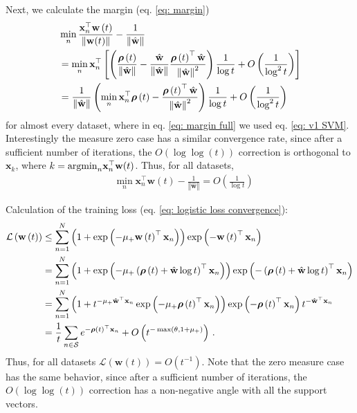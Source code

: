 \documentclass[twoside,11pt,english]{article}
\newcommand{\norm}[1]{\left\lVert{#1}\right\rVert}
\begin{document}
Next, we calculate the margin (eq. \ref{eq: margin})
\begin{align}
 & \min_{n}\frac{\mathbf{x}_{n}^{\top}\mathbf{w}\left(t\right)}{\norm{\wvec(t)}}- \frac{1}{\left\Vert \hat{\mathbf{w}}\right\Vert }\nonumber \\
 & =\min_{n}\mathbf{x}_{n}^{\top}\left[\left(\frac{\boldsymbol{\rho}\left(t\right)}{\left\Vert \hat{\mathbf{w}}\right\Vert }-\frac{\hat{\mathbf{w}}}{\left\Vert \hat{\mathbf{w}}\right\Vert }\frac{\boldsymbol{\rho}\left(t\right)^{\top}\hat{\mathbf{w}}}{\left\Vert \hat{\mathbf{w}}\right\Vert ^{2}}\right)\frac{1}{\log t}+O\left(\frac{1}{\log^{2}t}\right)\right]\nonumber \\
 & =\frac{1}{\left\Vert \hat{\mathbf{w}}\right\Vert }\left(\min_{n}\mathbf{x}_{n}^{\top}\boldsymbol{\rho}\left(t\right)-\frac{\boldsymbol{\rho}\left(t\right)^{\top}\hat{\mathbf{w}}}{\left\Vert \hat{\mathbf{w}}\right\Vert ^{2}}\right)\frac{1}{\log t}+O\left(\frac{1}{\log^{2}t}\right)\label{eq: margin full}
\end{align}
for almost every dataset, where in eq. \ref{eq: margin full} we used eq. \ref{eq: v1 SVM}. Interestingly the measure zero case has a similar convergence rate, since after a sufficient number of iterations, the $O(\log \log (t))$ correction is orthogonal to $\mathbf{x}_k$, where $k=\mathrm{argmin}_n \mathbf{x}_{n}^{\top} \mathbf{w}(t)$.
Thus, for all datasets,
\begin{align}
 & \min_{n}\mathbf{x}_{n}^{\top}\mathbf{w}\left(t\right) -\frac{1}{\left\Vert \hat{\mathbf{w}}\right\Vert } = O\left(\frac{1}{\log t}\right)
\end{align}

Calculation of the training loss (eq. \ref{eq: logistic loss convergence}):
\begin{align*}
\mathcal{L}\left(\mathbf{w}\left(t\right)\right) & \leq\sum_{n=1}^{N}\left(1+\exp\left(-\mu_{+}\mathbf{w}\left(t\right)^{\top}\mathbf{x}_{n}\right)\right)\exp\left(-\mathbf{w}\left(t\right)^{\top}\mathbf{x}_{n}\right)\\
 & =\sum_{n=1}^{N}\left(1+\exp\left(-\mu_{+}\left(\boldsymbol{\rho}\left(t\right)+\hat{\mathbf{w}}\log t\right)^{\top}\mathbf{x}_{n}\right)\right)\exp\left(-\left(\boldsymbol{\rho}\left(t\right)+\hat{\mathbf{w}}\log t\right)^{\top}\mathbf{x}_{n}\right)\\
 & =\sum_{n=1}^{N}\left(1+t^{-\mu_{+}\hat{\mathbf{w}}^{\top}\mathbf{x}_{n}}\exp\left(-\mu_{+}\boldsymbol{\rho}\left(t\right)^{\top}\mathbf{x}_{n}\right)\right)\exp\left(-\boldsymbol{\rho}\left(t\right)^{\top}\mathbf{x}_{n}\right)t^{-\hat{\mathbf{w}}^{\top}\mathbf{x}_{n}}\\
 & =\frac{1}{t}\sum_{n\in\mathcal{S}}e^{-\boldsymbol{\rho}\left(t\right)^{\top}\mathbf{x}_{n}}+O\left(t^{-\max\left(\theta,1+\mu_{+}\right)}\right)\,.
\end{align*}
Thus, for all datasets $\mathcal{L}\left(\mathbf{w}\left(t\right)\right)=O(t^{-1})$. Note that the zero measure case has the same behavior, since after a sufficient number of iterations, the $O(\log \log (t))$ correction has a non-negative angle with all the support vectors.
\end{document}
